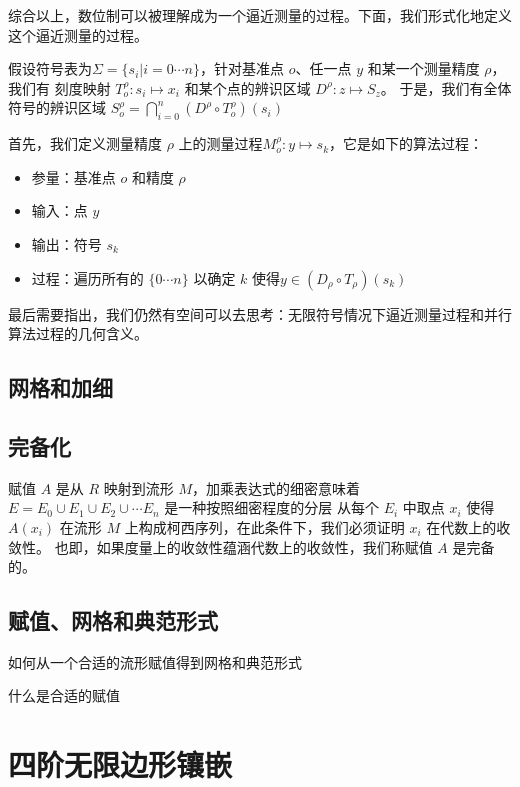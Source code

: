 \documentclass[a4paper,12pt]{article}
\numberwithin{definition}{section}
\numberwithin{lemma}{section}
\numberwithin{proposition}{section}
\numberwithin{theorem}{section}
\numberwithin{grammar}{section}
\numberwithin{program}{section}
\numberwithin{convention}{section}
\numberwithin{corollary}{section}
\begin{document}
综合以上，数位制可以被理解成为一个逼近测量的过程。下面，我们形式化地定义这个逼近测量的过程。

假设符号表为$\Sigma = \{s_i | i = 0 \cdots n\}$，针对基准点 $o$、任一点 $y$ 和某一个测量精度 $\rho$，我们有
刻度映射 $T_o^\rho: s_i \mapsto x_i$ 和某个点的辨识区域 $D^\rho: z \mapsto S_z$。
于是，我们有全体符号的辨识区域 $S_o^\rho = \bigcap_{i=0}^n (D^\rho \circ T_o^\rho)(s_i)$

首先，我们定义测量精度 $\rho$ 上的测量过程$M_o^\rho: y \mapsto s_k$，它是如下的算法过程：
\begin{itemize}
    \item 参量：基准点 $o$ 和精度 $\rho$
    \item 输入：点 $y$
    \item 输出：符号 $s_k$
    \item 过程：遍历所有的 $\{0 \cdots n\}$ 以确定 $k$ 使得$y \in (D_\rho \circ T_\rho)(s_k)$
\end{itemize}

最后需要指出，我们仍然有空间可以去思考：无限符号情况下逼近测量过程和并行算法过程的几何含义。

\subsection{网格和加细}

\subsection{完备化}

赋值 $A$ 是从 $R$ 映射到流形 $M$，加乘表达式的细密意味着 $E = E_0 \cup E_1 \cup E_2 \cup \cdots E_n$ 是一种按照细密程度的分层
从每个 $E_i$ 中取点 $x_i$ 使得 $A(x_i)$ 在流形 $M$ 上构成柯西序列，在此条件下，我们必须证明 $x_i$ 在代数上的收敛性。
也即，如果度量上的收敛性蕴涵代数上的收敛性，我们称赋值 $A$ 是完备的。

\subsection{赋值、网格和典范形式}

如何从一个合适的流形赋值得到网格和典范形式

什么是合适的赋值

\newpage

\section{四阶无限边形镶嵌}
\end{document}
